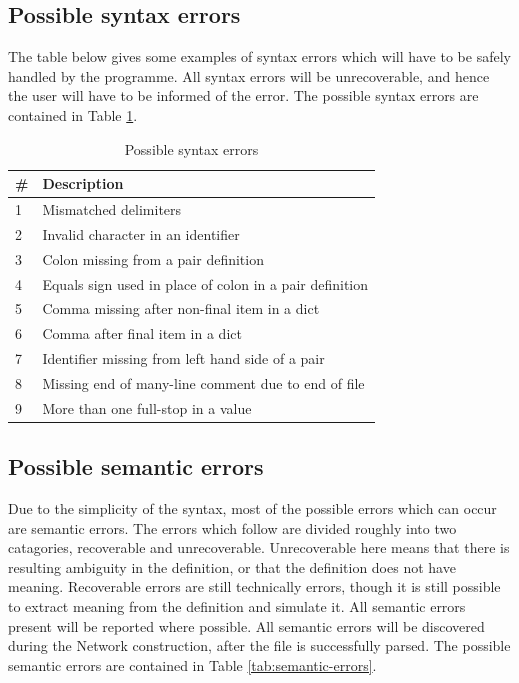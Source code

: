 \documentclass[a4paper]{article}
\begin{document}
    \subsection{Possible syntax errors}
	    The table below gives some examples of syntax errors which will have to be safely handled by the programme. All syntax errors will be unrecoverable, and hence the user will have to be informed of the error. The possible syntax errors are contained in Table \ref{tab:syntax-errors}.

		\begin{table}[h]
            \centering
            \begin{tabular}{p{0.5cm}p{8cm}}
                \toprule
                \#     & Description                                                              \\ \midrule
                1      & Mismatched delimiters                                                    \\
				2      & Invalid character in an identifier                                       \\
				3      & Colon missing from a pair definition                                     \\
				4      & Equals sign used in place of colon in a pair definition                  \\
				5      & Comma missing after non-final item in a dict                             \\
				6      & Comma after final item in a dict                                         \\
				7      & Identifier missing from left hand side of a pair                         \\
				8      & Missing end of many-line comment due to end of file                      \\
				9      & More than one full-stop in a value                                       \\ \bottomrule
            \end{tabular}
			\caption{Possible syntax errors}
            \label{tab:syntax-errors}
        \end{table}

    \subsection{Possible semantic errors}
        Due to the simplicity of the syntax, most of the possible errors which can occur are semantic errors. The errors which follow are divided roughly into two catagories, recoverable and unrecoverable. Unrecoverable here means that there is resulting ambiguity in the definition, or that the definition does not have meaning. Recoverable errors are still technically errors, though it is still possible to extract meaning from the definition and simulate it. All semantic errors present will be reported where possible. All semantic errors will be discovered during the Network construction, after the file is successfully parsed. The possible semantic errors are contained in Table \ref{tab:semantic-errors}.
\end{document}
